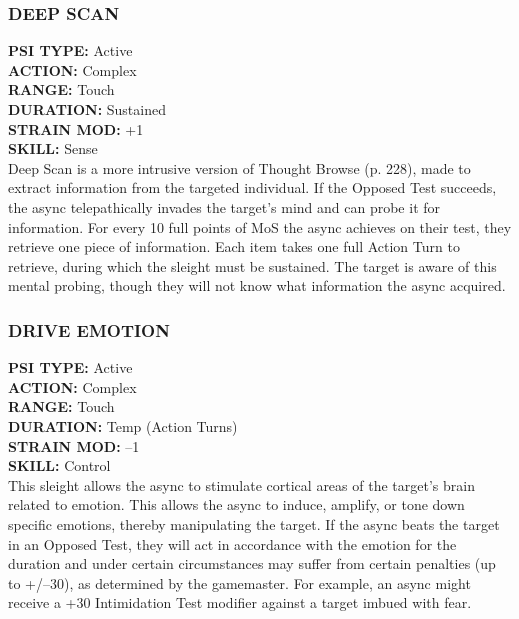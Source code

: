 \subsubsection{DEEP SCAN}
\textbf{PSI TYPE:} Active \\ 
\textbf{ACTION:} Complex \\ 
\textbf{RANGE:} Touch \\ 
\textbf{DURATION:} Sustained \\
\textbf{STRAIN MOD:} +1 \\ 
\textbf{SKILL:} Sense\\
Deep Scan is a more intrusive version of Thought
Browse (p. 228), made to extract information from the
targeted individual. If the Opposed Test succeeds, the
async telepathically invades the target’s mind and can
probe it for information. For every 10 full points of MoS
the async achieves on their test, they retrieve one piece
of information. Each item takes one full Action Turn to
retrieve, during which the sleight must be sustained. The
target is aware of this mental probing, though they will
not know what information the async acquired.

\subsubsection{DRIVE EMOTION}
\textbf{PSI TYPE:} Active \\ 
\textbf{ACTION:} Complex \\ 
\textbf{RANGE:} Touch \\ 
\textbf{DURATION:} Temp (Action Turns) \\
\textbf{STRAIN MOD:} –1 \\ 
\textbf{SKILL:} Control\\
This sleight allows the async to stimulate cortical areas
of the target’s brain related to emotion. This allows
the async to induce, amplify, or tone down specific
emotions, thereby manipulating the target. If the async
beats the target in an Opposed Test, they will act in accordance
with the emotion for the duration and under
certain circumstances may suffer from certain penalties
(up to +/–30), as determined by the gamemaster. For
example, an async might receive a +30 Intimidation
Test modifier against a target imbued with fear.

